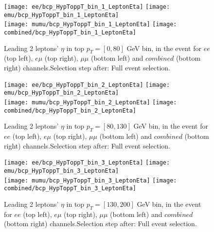 \documentclass[12pt, a4paper, titlepage]{article}
\begin{document}
\begin{figure}
  \texttt{[image: ee/bcp\_HypToppT\_bin\_1\_LeptonEta]}
  \texttt{[image: emu/bcp\_HypToppT\_bin\_1\_LeptonEta]}\\
  \texttt{[image: mumu/bcp\_HypToppT\_bin\_1\_LeptonEta]}
  \texttt{[image: combined/bcp\_HypToppT\_bin\_1\_LeptonEta]}
\caption{Leading 2 leptons' $\eta$ in top $p_T = [0,80]$ GeV bin, in the event for $ee$ (top left), $e\mu$ (top right), $\mu\mu$ (bottom left) and $combined$ (bottom right) channels.\newline Selection step after: Full event selection.}
\end{figure}

\clearpage
\newpage


\begin{figure}
  \texttt{[image: ee/bcp\_HypToppT\_bin\_2\_LeptonEta]}
  \texttt{[image: emu/bcp\_HypToppT\_bin\_2\_LeptonEta]}\\
  \texttt{[image: mumu/bcp\_HypToppT\_bin\_2\_LeptonEta]}
  \texttt{[image: combined/bcp\_HypToppT\_bin\_2\_LeptonEta]}
\caption{Leading 2 leptons' $\eta$ in top $p_T = [80,130]$ GeV bin, in the event for $ee$ (top left), $e\mu$ (top right), $\mu\mu$ (bottom left) and $combined$ (bottom right) channels.\newline Selection step after: Full event selection.}
\end{figure}

\clearpage
\newpage


\begin{figure}
  \texttt{[image: ee/bcp\_HypToppT\_bin\_3\_LeptonEta]}
  \texttt{[image: emu/bcp\_HypToppT\_bin\_3\_LeptonEta]}\\
  \texttt{[image: mumu/bcp\_HypToppT\_bin\_3\_LeptonEta]}
  \texttt{[image: combined/bcp\_HypToppT\_bin\_3\_LeptonEta]}
\caption{Leading 2 leptons' $\eta$ in top $p_T = [130,200]$ GeV bin, in the event for $ee$ (top left), $e\mu$ (top right), $\mu\mu$ (bottom left) and $combined$ (bottom right) channels.\newline Selection step after: Full event selection.}
\end{figure}

\clearpage
\newpage
\end{document}
